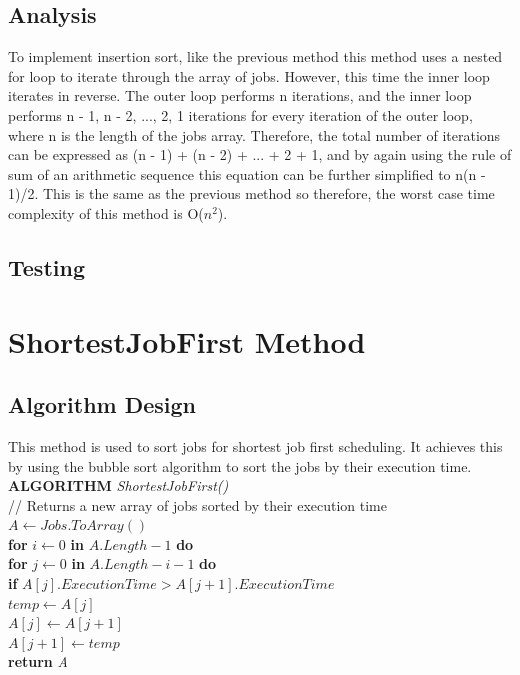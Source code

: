 \documentclass[12pt,a4paper]{article}
\begin{document}
		\subsection{Analysis}
			To implement insertion sort, like the previous method this method uses a nested for loop to 
			iterate through the array of jobs. However, this time the inner loop iterates in reverse. 
			The outer loop performs n iterations, and the inner loop performs n - 1, n - 2, ..., 2, 1 
			iterations for every iteration of the outer loop, where n is the length of the jobs array. Therefore, 
			the total number of iterations can be expressed as (n - 1) + (n - 2) + ... + 2 + 1, and by again 
			using the rule of sum of an arithmetic sequence this equation can be further simplified to n(n - 1)/2. 
			This is the same as the previous method so therefore, the worst case time complexity of this method 
			is O($n ^ 2$).\\

		\subsection{Testing}
	\section{ShortestJobFirst Method}
		\subsection{Algorithm Design}
			This method is used to sort jobs for shortest job first scheduling. It achieves this by 
			using the bubble sort algorithm to sort the jobs by their execution time.\\
			
			\textbf{ALGORITHM} \textit{ShortestJobFirst()}\\
			\null\hspace{1cm}// Returns a new array of jobs sorted by their execution time\\
			\null\hspace{1cm}\textit{$A \gets Jobs.ToArray()$}\\
			\null\hspace{1cm}\textbf{for} \textit{$i \gets 0$} \textbf{in} \textit{$A.Length - 1$} \textbf{do}\\
			\null\hspace{2cm}\textbf{for} \textit{$j \gets 0$} \textbf{in} \textit{$A.Length - i - 1$} \textbf{do}\\
			\null\hspace{3cm}\textbf{if} \textit{$A[j].ExecutionTime > A[j + 1].ExecutionTime$}\\
			\null\hspace{4cm}\textit{$temp \gets A[j]$}\\
			\null\hspace{4cm}\textit{$A[j] \gets A[j + 1]$}\\
			\null\hspace{4cm}\textit{$A[j + 1] \gets temp$}\\
			\null\hspace{1cm}\textbf{return} \textit{A}\\
\end{document}
